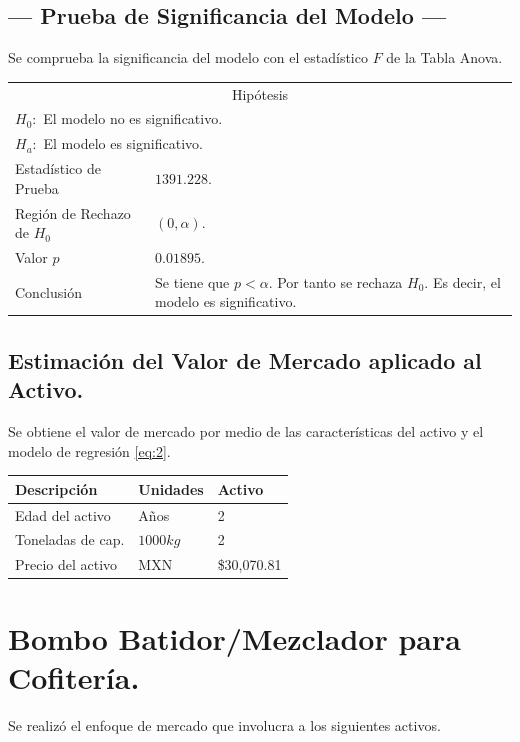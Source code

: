 \subsection{\centering --- Prueba de Significancia del Modelo ---} %
Se comprueba la significancia del modelo con el estadístico \(F\) de la Tabla Anova.
\begin{center}
  \begin{tabular}{|l|p{6cm}|}
    \cline{1-2}
    \multicolumn{2}{|c|}{Hipótesis}\\ \cline{1-2}
    \multicolumn{2}{|l|}{\(H_0:\) El modelo no es significativo.} \\ 
    \multicolumn{2}{|l|}{\(H_a:\) El modelo es significativo.} \\ \cline{1-2}
    Estadístico de Prueba & \(1391.228\).\\ \cline{1-2} 
		Región de Rechazo de \(H_0\) & \((0, \alpha )\).\\ \cline{1-2} 
    Valor \(p\) & \(0.01895\).\\ \cline{1-2} 
    Conclusión & Se tiene que \(p<\alpha\). \newline 
		Por tanto se rechaza \(H_0\). \newline 
		Es decir, el modelo es significativo.\\ \cline{1-2} 
  \end{tabular}
\end{center} 

\subsection{\centering Estimación del Valor de Mercado aplicado al Activo.} %
Se obtiene el valor de mercado por medio de las características del activo y el modelo de regresión \eqref{eq:2}.
\begin{center}
  \begin{tabular}{|l|l|l|}
    \hline 
		Descripción   & Unidades  & Activo \\ \hline 
    Edad del activo    & Años      & 2      \\ \hline 
		Toneladas de cap.  & \(1000kg\) & 2   \\ \hline 
		Precio del activo   & MXN       & \$30,070.81  \\ \hline 
  \end{tabular}
\end{center} 


\section{Bombo Batidor/Mezclador para Cofitería.} %
Se realizó el enfoque de mercado que involucra a los siguientes activos.

